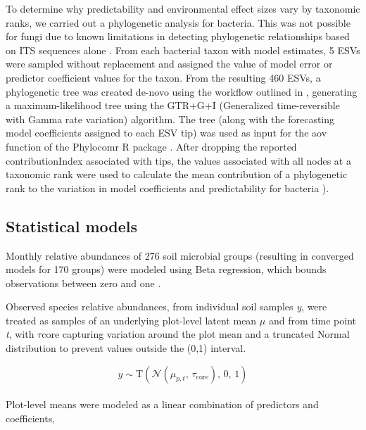 \documentclass[11pt]{article}
\begin{document}
To determine why predictability and environmental effect sizes vary by taxonomic ranks, we carried out a phylogenetic analysis for bacteria. This was not possible for fungi due to known limitations in detecting phylogenetic relationships based on ITS sequences alone \cite{lucking_unambiguous_2020}. From each bacterial taxon with model estimates, 5 ESVs were sampled without replacement and assigned the value of model error or predictor coefficient values for the taxon. From the resulting 460 ESVs, a phylogenetic tree was created de-novo using the workflow outlined in \cite{callahan_bioconductor_2016}, generating a maximum-likelihood tree using the GTR+G+I (Generalized time-reversible with Gamma rate variation) algorithm. The tree (along with the forecasting model coefficients assigned to each ESV tip) was used as input for the aov function of the Phylocomr R package \cite{ooms_phylocomr_2023}. After dropping the reported contributionIndex associated with tips, the values associated with all nodes at a taxonomic rank were used to calculate the mean contribution of a phylogenetic rank to the variation in model coefficients and predictability for bacteria \cite{vivelo_evolutionary_2019}).

\subsection{Statistical models }

Monthly relative abundances of 276 soil microbial groups (resulting in converged models for 170 groups) were modeled using Beta regression, which bounds observations between zero and one \cite{ferrari_beta_2004}. 

Observed species relative abundances, from individual soil samples \textit{y}, were treated as samples of an underlying plot-level latent mean $\mu$ and from time point \textit{t}, with $\tau$core capturing variation around the plot mean and a truncated Normal distribution to prevent values outside the (0,1) interval.


\begin{equation}
y \sim \text{T}\!\left(\mathcal{N}(\mu_{p,t},\, \tau_\text{core}),\, 0,\, 1\right)
\label{eq:obs_model}
\end{equation}
 \\
Plot-level means were modeled as a linear combination of predictors and coefficients,  \\
\end{document}
